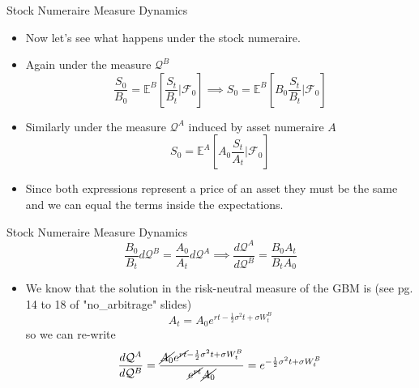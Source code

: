 \documentclass{beamer}
\begin{document}
\begin{frame}{Stock Numeraire Measure Dynamics}
  \begin{itemize}
  \item Now let's see what happens under the stock numeraire.
  \item Again under the measure $\mathcal{Q}^B$
    \begin{equation*}
      \frac{S_0}{B_0} = \mathbb{E}^B\left[\frac{S_t}{B_t}\bigg|\mathcal{F}_0\right] \implies
      S_0 = \mathbb{E}^B\left[B_0\frac{S_t}{B_t}\bigg|\mathcal{F}_0\right]
    \end{equation*}
  \item Similarly under the measure $\mathcal{Q}^A$ induced by asset numeraire $A$
    \begin{equation*}
      S_0 = \mathbb{E}^A\left[A_0\frac{S_t}{A_t}\bigg|\mathcal{F}_0\right]
    \end{equation*}
  \item Since both expressions represent a price of an asset they must be the same and we can equal the terms inside the expectations.
  \end{itemize}
\end{frame}

\begin{frame}{Stock Numeraire Measure Dynamics}
  \begin{equation*}
    \frac{B_0}{B_t}d\mathcal{Q}^B = \frac{A_0}{A_t}d\mathcal{Q}^A\implies \frac{d\mathcal{Q}^A}{d\mathcal{Q}^B}=\frac{B_0A_t}{B_tA_0}
  \end{equation*}
  \begin{itemize}
  \item We know that the solution in the risk-neutral measure of the GBM is (see pg. 14 to 18 of "no\_arbitrage" slides)
    \begin{equation*} 
      A_t = A_0 e^{rt-\frac{1}{2}\sigma^2 t + \sigma W^B_t}
    \end{equation*}
    so we can re-write
    \begin{equation*}
      \frac{d\mathcal{Q}^A}{d\mathcal{Q}^B}=\frac{\cancel{A_0}e^{\cancel{rt}-\frac{1}{2}\sigma^2 t + \sigma W^B_t}}{\cancel{e^{rt}}\cancel{A_0}}=e^{-\frac{1}{2}\sigma^2 t + \sigma W^B_t}
    \end{equation*}
  \end{itemize}
\end{frame}
\end{document}
